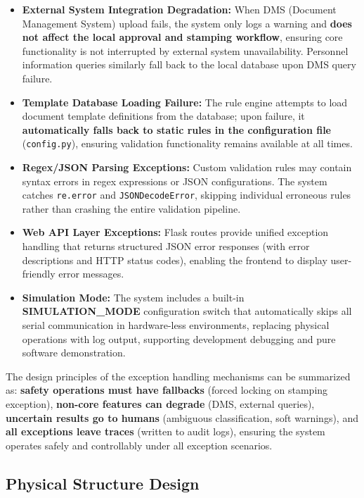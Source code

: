 \documentclass[conference]{IEEEtran}
\begin{document}
\begin{itemize}[leftmargin=*]
    \item \textbf{External System Integration Degradation:} When DMS (Document Management System) upload fails, the system only logs a warning and \textbf{does not affect the local approval and stamping workflow}, ensuring core functionality is not interrupted by external system unavailability. Personnel information queries similarly fall back to the local database upon DMS query failure.
    \item \textbf{Template Database Loading Failure:} The rule engine attempts to load document template definitions from the database; upon failure, it \textbf{automatically falls back to static rules in the configuration file} (\texttt{config.py}), ensuring validation functionality remains available at all times.
    \item \textbf{Regex/JSON Parsing Exceptions:} Custom validation rules may contain syntax errors in regex expressions or JSON configurations. The system catches \texttt{re.error} and \texttt{JSONDecodeError}, skipping individual erroneous rules rather than crashing the entire validation pipeline.
    \item \textbf{Web API Layer Exceptions:} Flask routes provide unified exception handling that returns structured JSON error responses (with error descriptions and HTTP status codes), enabling the frontend to display user-friendly error messages.
    \item \textbf{Simulation Mode:} The system includes a built-in \textbf{SIMULATION\_MODE} configuration switch that automatically skips all serial communication in hardware-less environments, replacing physical operations with log output, supporting development debugging and pure software demonstration.
\end{itemize}

\noindent The design principles of the exception handling mechanisms can be summarized as: \textbf{safety operations must have fallbacks} (forced locking on stamping exception), \textbf{non-core features can degrade} (DMS, external queries), \textbf{uncertain results go to humans} (ambiguous classification, soft warnings), and \textbf{all exceptions leave traces} (written to audit logs), ensuring the system operates safely and controllably under all exception scenarios.

\subsection{Physical Structure Design}
\end{document}
